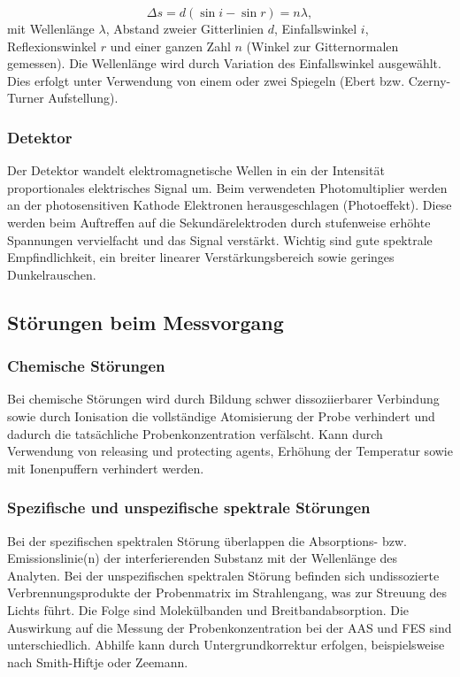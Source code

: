         \begin{equation}
          \Delta s = d \left(\sin i - \sin r\right) = n \lambda,
        \end{equation}
      mit Wellenlänge $\lambda$, Abstand zweier Gitterlinien $d$, Einfallswinkel $i$, Reflexionswinkel $r$ und einer ganzen Zahl $n$ (Winkel zur Gitternormalen gemessen). Die Wellenlänge wird durch Variation des Einfallswinkel ausgewählt. Dies erfolgt unter Verwendung von einem oder zwei Spiegeln (Ebert bzw. Czerny-Turner Aufstellung). \citep{AnalytikIII}
      
    \subsubsection{Detektor}
      
      Der Detektor wandelt elektromagnetische Wellen in ein der Intensität proportionales elektrisches Signal um. Beim verwendeten Photomultiplier werden an der photosensitiven Kathode Elektronen herausgeschlagen (Photoeffekt). Diese werden beim Auftreffen auf die Sekundärelektroden durch stufenweise erhöhte Spannungen vervielfacht und das Signal verstärkt. Wichtig sind gute spektrale Empfindlichkeit, ein breiter linearer Verstärkungsbereich sowie geringes Dunkelrauschen. \citep{AnalytikIII}
      
  \subsection{Störungen beim Messvorgang}
    
    \subsubsection{Chemische Störungen}
    
      Bei chemische Störungen wird durch Bildung schwer dissoziierbarer Verbindung sowie durch Ionisation die vollständige Atomisierung der Probe verhindert und dadurch die tatsächliche Probenkonzentration verfälscht. Kann durch Verwendung von releasing und protecting agents, Erhöhung der Temperatur sowie mit Ionenpuffern verhindert werden. \citep{AnalytikIII}
  
    \subsubsection{Spezifische und unspezifische spektrale Störungen}
      
      Bei der spezifischen spektralen Störung überlappen die Absorptions- bzw. Emissionslinie(n) der interferierenden Substanz mit der Wellenlänge des Analyten. Bei der unspezifischen spektralen Störung befinden sich undissozierte Verbrennungsprodukte der Probenmatrix im Strahlengang, was zur Streuung des Lichts führt. Die Folge sind Molekülbanden und Breitbandabsorption. Die Auswirkung auf die Messung der Probenkonzentration bei der AAS und FES sind unterschiedlich. Abhilfe kann durch Untergrundkorrektur erfolgen, beispielsweise nach Smith-Hiftje oder Zeemann. \citep{AnalytikIII}
  
      